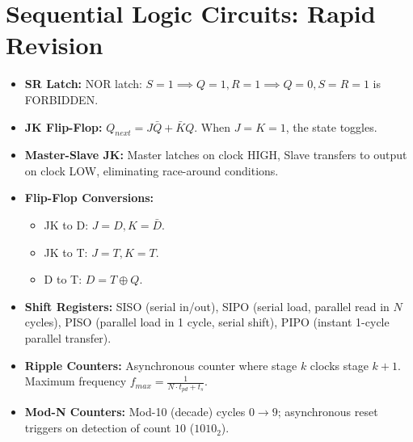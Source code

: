 \chapter{Sequential Logic Circuits: Rapid Revision}

\begin{highyieldbox}
\begin{itemize}[leftmargin=*]
    \item \textbf{SR Latch:} NOR latch: $S=1 \implies Q=1, R=1 \implies Q=0, S=R=1$ is FORBIDDEN.
    \item \textbf{JK Flip-Flop:} $Q_{next} = J\bar{Q} + \bar{K}Q$. When $J=K=1$, the state toggles.
    \item \textbf{Master-Slave JK:} Master latches on clock HIGH, Slave transfers to output on clock LOW, eliminating race-around conditions.
    \item \textbf{Flip-Flop Conversions:}
    \begin{itemize}
        \item JK to D: $J = D, K = \bar{D}$.
        \item JK to T: $J = T, K = T$.
        \item D to T: $D = T \oplus Q$.
    \end{itemize}
    \item \textbf{Shift Registers:} SISO (serial in/out), SIPO (serial load, parallel read in $N$ cycles), PISO (parallel load in 1 cycle, serial shift), PIPO (instant 1-cycle parallel transfer).
    \item \textbf{Ripple Counters:} Asynchronous counter where stage $k$ clocks stage $k+1$. Maximum frequency $f_{max} = \frac{1}{N \cdot t_{pd} + t_s}$.
    \item \textbf{Mod-N Counters:} Mod-10 (decade) cycles $0 \to 9$; asynchronous reset triggers on detection of count $10$ ($1010_2$).
\end{itemize}
\end{highyieldbox}
